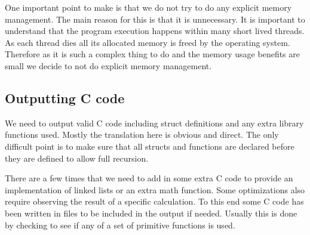 \documentclass[a4paper]{article}
\begin{document}
One important point to make is that we do not try to do any explicit memory management. The main reason for this is that it is unnecessary. It is important to understand that the program execution happens within many short lived threads. As each thread dies all its allocated memory is freed by the operating system. Therefore as it is such a complex thing to do and the memory usage benefits are small we decide to not do explicit memory management.




\subsection{Outputting C code}

We need to output valid C code including struct definitions and any extra library functions used. Mostly the translation here is obvious and direct. The only difficult point is to make sure that all structs and functions are declared before they are defined to allow full recursion.

There are a few times that we need to add in some extra C code to provide an implementation of linked lists or an extra math function. Some optimizations also require observing the result of a specific calculation. To this end some C code has been written in files to be included in the output if needed. Usually this is done by checking to see if any of a set of primitive functions is used.



\end{document}
